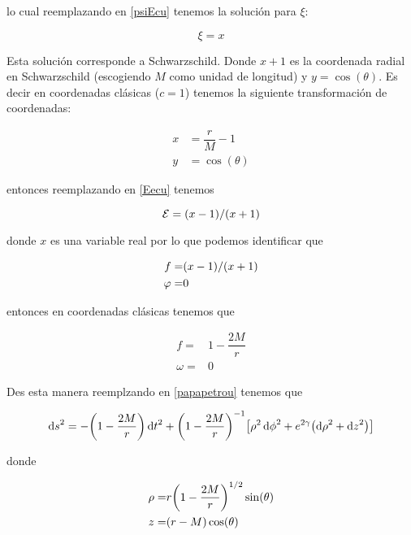 \documentclass[../Main.tex]{subfiles}
\begin{document}
lo cual reemplazando en \eqref{psiEcu} tenemos la solución para $\xi$:

\begin{equation}
    \xi = x
\end{equation}

Esta solución corresponde a Schwarzschild. Donde $x+1$ es la coordenada radial en Schwarzschild (escogiendo $M$ como unidad de longitud) y $y=\cos(\theta)$. Es decir en coordenadas clásicas ($c=1$) tenemos la siguiente transformación de coordenadas:

\begin{eqnarray}
    \label{xTor}
    x &= \dfrac{r}{M}-1 \\
    \label{yToTheta}
    y &= \cos(\theta)
\end{eqnarray}

entonces reemplazando en \eqref{Eecu} tenemos

\begin{equation}
    \mathcal{E}=\qty(x-1)/\qty(x+1)
\end{equation}

donde $x$ es una variable real por lo que podemos identificar que

\begin{eqnarray}
    \label{fecures}
    f = & \qty(x-1)/\qty(x+1) \\
    \label{varphiecures}
    \varphi = & 0
\end{eqnarray}

entonces en coordenadas clásicas tenemos que

\begin{eqnarray}
    \label{fecuresSch}
    f = & 1-\dfrac{2M}{r} \\
    \label{omegaecuresSch}
    \omega = & 0
\end{eqnarray}

Des esta manera reemplzando en \eqref{papapetrou} tenemos que

\begin{equation}
    \dd{s}^{2} = -\qty(1-\dfrac{2M}{r})\dd{t}^{2}+\qty(1-\dfrac{2M}{r})^{-1}\qty[\rho^{2}\dd{\phi}^{2}+e^{2\gamma}\qty(\dd{\rho}^{2}+\dd{z}^{2})]
\end{equation}

donde

\begin{eqnarray}
    \label{rhoTortheta}
    \rho = & r\qty(1-\dfrac{2M}{r})^{1/2}\sin (\theta) \\
    \label{zTortheta}
    z = & \qty(r-M)\cos(\theta) \\
    \label{r}
\end{eqnarray}
\end{document}
